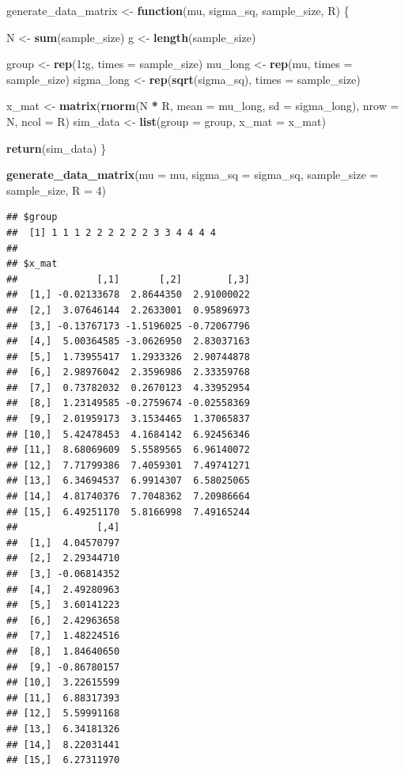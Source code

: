 \documentclass[
]{book}
\newenvironment{Shaded}{\begin{snugshade}}{\end{snugshade}}
\newcommand{\AttributeTok}[1]{\textcolor[rgb]{0.13,0.29,0.53}{#1}}
\newcommand{\ControlFlowTok}[1]{\textcolor[rgb]{0.13,0.29,0.53}{\textbf{#1}}}
\newcommand{\DecValTok}[1]{\textcolor[rgb]{0.00,0.00,0.81}{#1}}
\newcommand{\FunctionTok}[1]{\textcolor[rgb]{0.13,0.29,0.53}{\textbf{#1}}}
\newcommand{\NormalTok}[1]{#1}
\newcommand{\OtherTok}[1]{\textcolor[rgb]{0.56,0.35,0.01}{#1}}
\newcommand{\SpecialCharTok}[1]{\textcolor[rgb]{0.81,0.36,0.00}{\textbf{#1}}}
\begin{document}
\begin{Shaded}
\begin{Highlighting}[]
\NormalTok{generate\_data\_matrix }\OtherTok{\textless{}{-}} \ControlFlowTok{function}\NormalTok{(mu, sigma\_sq, sample\_size, R) \{}

\NormalTok{  N }\OtherTok{\textless{}{-}} \FunctionTok{sum}\NormalTok{(sample\_size) }
\NormalTok{  g }\OtherTok{\textless{}{-}} \FunctionTok{length}\NormalTok{(sample\_size) }
  
\NormalTok{  group }\OtherTok{\textless{}{-}} \FunctionTok{rep}\NormalTok{(}\DecValTok{1}\SpecialCharTok{:}\NormalTok{g, }\AttributeTok{times =}\NormalTok{ sample\_size) }
\NormalTok{  mu\_long }\OtherTok{\textless{}{-}} \FunctionTok{rep}\NormalTok{(mu, }\AttributeTok{times =}\NormalTok{ sample\_size)}
\NormalTok{  sigma\_long }\OtherTok{\textless{}{-}} \FunctionTok{rep}\NormalTok{(}\FunctionTok{sqrt}\NormalTok{(sigma\_sq), }\AttributeTok{times =}\NormalTok{ sample\_size) }

\NormalTok{  x\_mat }\OtherTok{\textless{}{-}} \FunctionTok{matrix}\NormalTok{(}\FunctionTok{rnorm}\NormalTok{(N }\SpecialCharTok{*}\NormalTok{ R, }\AttributeTok{mean =}\NormalTok{ mu\_long, }\AttributeTok{sd =}\NormalTok{ sigma\_long),}
                  \AttributeTok{nrow =}\NormalTok{ N, }\AttributeTok{ncol =}\NormalTok{ R)}
\NormalTok{  sim\_data }\OtherTok{\textless{}{-}} \FunctionTok{list}\NormalTok{(}\AttributeTok{group =}\NormalTok{ group, }\AttributeTok{x\_mat =}\NormalTok{ x\_mat)}
    
  \FunctionTok{return}\NormalTok{(sim\_data)}
\NormalTok{\}}

\FunctionTok{generate\_data\_matrix}\NormalTok{(}\AttributeTok{mu =}\NormalTok{ mu, }\AttributeTok{sigma\_sq =}\NormalTok{ sigma\_sq,}
                     \AttributeTok{sample\_size =}\NormalTok{ sample\_size, }\AttributeTok{R =} \DecValTok{4}\NormalTok{)}
\end{Highlighting}
\end{Shaded}

\begin{verbatim}
## $group
##  [1] 1 1 1 2 2 2 2 2 2 3 3 4 4 4 4
## 
## $x_mat
##              [,1]       [,2]        [,3]
##  [1,] -0.02133678  2.8644350  2.91000022
##  [2,]  3.07646144  2.2633001  0.95896973
##  [3,] -0.13767173 -1.5196025 -0.72067796
##  [4,]  5.00364585 -3.0626950  2.83037163
##  [5,]  1.73955417  1.2933326  2.90744878
##  [6,]  2.98976042  2.3596986  2.33359768
##  [7,]  0.73782032  0.2670123  4.33952954
##  [8,]  1.23149585 -0.2759674 -0.02558369
##  [9,]  2.01959173  3.1534465  1.37065837
## [10,]  5.42478453  4.1684142  6.92456346
## [11,]  8.68069609  5.5589565  6.96140072
## [12,]  7.71799386  7.4059301  7.49741271
## [13,]  6.34694537  6.9914307  6.58025065
## [14,]  4.81740376  7.7048362  7.20986664
## [15,]  6.49251170  5.8166998  7.49165244
##              [,4]
##  [1,]  4.04570797
##  [2,]  2.29344710
##  [3,] -0.06814352
##  [4,]  2.49280963
##  [5,]  3.60141223
##  [6,]  2.42963658
##  [7,]  1.48224516
##  [8,]  1.84640650
##  [9,] -0.86780157
## [10,]  3.22615599
## [11,]  6.88317393
## [12,]  5.59991168
## [13,]  6.34181326
## [14,]  8.22031441
## [15,]  6.27311970
\end{verbatim}
\end{document}
